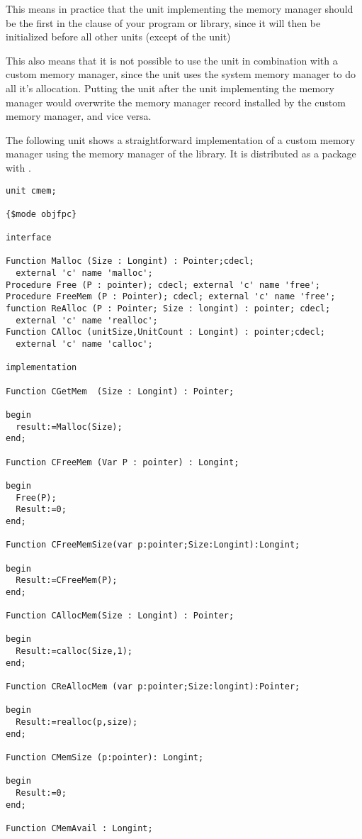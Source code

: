 {This means in practice that the unit implementing the memory manager should
be the first in the  clause of your program or library, since it
will then be initialized before all other units (except of the  unit)

This also means that it is not possible to use the  unit in
combination with a custom memory manager, since the  unit uses
the system memory manager to do all it's allocation. Putting the
 unit after the unit implementing the memory manager would
overwrite the memory manager record installed by the custom memory manager,
and vice versa.

The following unit shows a straightforward implementation of a custom
memory manager using the memory manager of the  library. It is
distributed  as a package with \fpc.
\begin{verbatim}
unit cmem;

{$mode objfpc}

interface

Function Malloc (Size : Longint) : Pointer;cdecl;
  external 'c' name 'malloc';
Procedure Free (P : pointer); cdecl; external 'c' name 'free';
Procedure FreeMem (P : Pointer); cdecl; external 'c' name 'free';
function ReAlloc (P : Pointer; Size : longint) : pointer; cdecl;
  external 'c' name 'realloc';
Function CAlloc (unitSize,UnitCount : Longint) : pointer;cdecl;
  external 'c' name 'calloc';

implementation

Function CGetMem  (Size : Longint) : Pointer;

begin
  result:=Malloc(Size);
end;

Function CFreeMem (Var P : pointer) : Longint;

begin
  Free(P);
  Result:=0;
end;

Function CFreeMemSize(var p:pointer;Size:Longint):Longint;

begin
  Result:=CFreeMem(P);
end;

Function CAllocMem(Size : Longint) : Pointer;

begin
  Result:=calloc(Size,1);
end;

Function CReAllocMem (var p:pointer;Size:longint):Pointer;

begin
  Result:=realloc(p,size);
end;

Function CMemSize (p:pointer): Longint;

begin
  Result:=0;
end;

Function CMemAvail : Longint;


\end{verbatim}}
